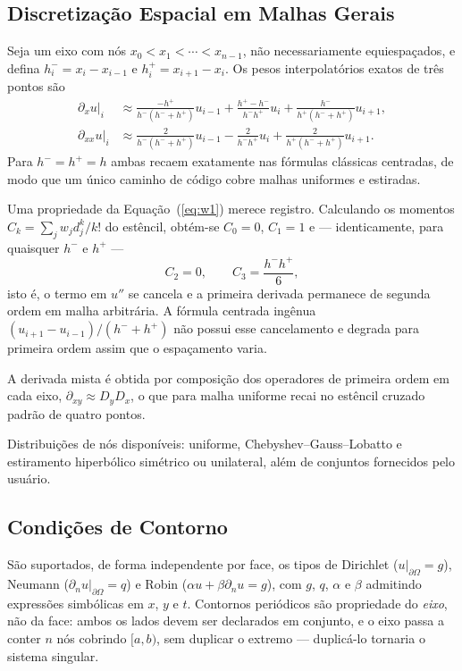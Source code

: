 \documentclass[10pt,brazil,english]{article}
\begin{document}
\subsection{Discretização Espacial em Malhas Gerais}
\label{sec:pesos}

Seja um eixo com nós $x_0 < x_1 < \cdots < x_{n-1}$, não necessariamente equiespaçados, e defina $h^-_i = x_i - x_{i-1}$ e $h^+_i = x_{i+1} - x_i$. Os pesos interpolatórios exatos de três pontos são
\begin{align}
  \partial_x u|_i &\approx \frac{-h^+}{h^-(h^-+h^+)}u_{i-1}
   + \frac{h^+-h^-}{h^-h^+}u_i + \frac{h^-}{h^+(h^-+h^+)}u_{i+1},
   \label{eq:w1}\\
  \partial_{xx} u|_i &\approx \frac{2}{h^-(h^-+h^+)}u_{i-1}
   - \frac{2}{h^-h^+}u_i + \frac{2}{h^+(h^-+h^+)}u_{i+1}.
   \label{eq:w2}
\end{align}
Para $h^- = h^+ = h$ ambas recaem exatamente nas fórmulas clássicas centradas, de modo que um único caminho de código cobre malhas uniformes e estiradas.

Uma propriedade da Equação~(\ref{eq:w1}) merece registro. Calculando os momentos $C_k = \sum_j w_j d_j^k / k!$ do estêncil, obtém-se $C_0 = 0$, $C_1 = 1$ e --- identicamente, para quaisquer $h^-$ e $h^+$ ---
\begin{equation}
  C_2 = 0, \qquad C_3 = \frac{h^-h^+}{6},
  \label{eq:momentos}
\end{equation}
isto é, o termo em $u''$ se cancela e a primeira derivada permanece de segunda ordem em malha arbitrária. A fórmula centrada ingênua $(u_{i+1}-u_{i-1})/(h^-+h^+)$ não possui esse cancelamento e degrada para primeira ordem assim que o espaçamento varia.

A derivada mista é obtida por composição dos operadores de primeira ordem em cada eixo, $\partial_{xy} \approx D_y D_x$, o que para malha uniforme recai no estêncil cruzado padrão de quatro pontos.

Distribuições de nós disponíveis: uniforme, Chebyshev--Gauss--Lobatto e estiramento hiperbólico simétrico ou unilateral, além de conjuntos fornecidos pelo usuário.

\subsection{Condições de Contorno}

São suportados, de forma independente por face, os tipos de Dirichlet ($u|_{\partial\Omega} = g$), Neumann ($\partial_n u|_{\partial\Omega} = q$) e Robin ($\alpha u + \beta \partial_n u = g$), com $g$, $q$, $\alpha$ e $\beta$ admitindo expressões simbólicas em $x$, $y$ e $t$. Contornos periódicos são propriedade do \emph{eixo}, não da face: ambos os lados devem ser declarados em conjunto, e o eixo passa a conter $n$ nós cobrindo $[a,b)$, sem duplicar o extremo --- duplicá-lo tornaria o sistema singular.
\end{document}
